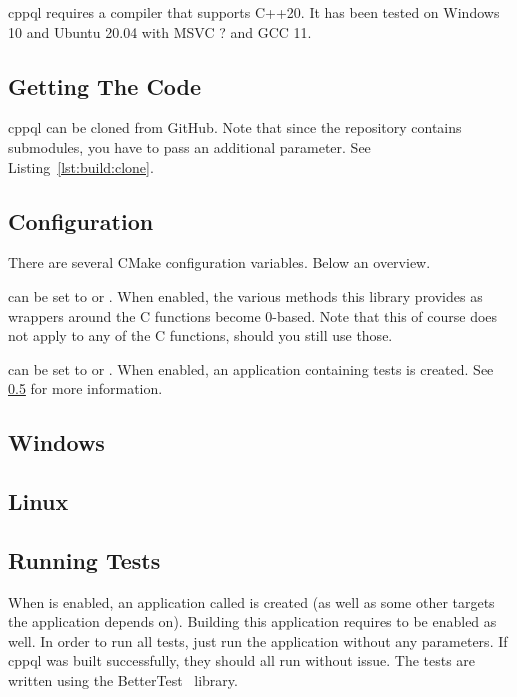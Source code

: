 cppql requires a compiler that supports C++20. It has been tested on Windows 10 and Ubuntu 20.04 with MSVC ? and GCC 11.

\subsection{Getting The Code}
\label{section:build:get}

\gls{cppql} can be cloned from GitHub. Note that since the repository contains submodules, you have to pass an additional parameter. See Listing~\ref{lst:build:clone}.



\subsection{Configuration}
\label{section:build:config}

There are several CMake configuration variables. Below an overview.

 can be set to  or . When enabled, the various  methods this library provides as wrappers around the C functions become 0-based. Note that this of course does not apply to any of the C functions, should you still use those.

 can be set to  or . When enabled, an application containing tests is created. See \ref{section:build:tests} for more information.

\subsection{Windows}
\label{section:build:windows}


\subsection{Linux}
\label{section:build:linux}


\subsection{Running Tests}
\label{section:build:tests}

When  is enabled, an application called  is created (as well as some other targets the application depends on). Building this application requires  to be enabled as well. In order to run all tests, just run the application without any parameters. If \gls{cppql} was built successfully, they should all run without issue. The tests are written using the BetterTest~\cite{bettertest} library.
